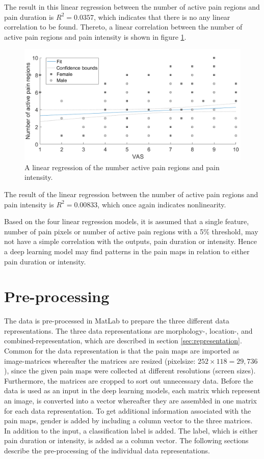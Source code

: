 \noindent
The result in this linear regression between the number of active pain regions and pain duration is $R^2=0.0357$, which indicates that there is no any linear correlation to be found.\newline
Thereto, a linear correlation between the number of active pain regions and pain intensity is shown in figure \ref{fig:regPain}.

\begin{figure} [H]
\centering
\includegraphics[width=1\textwidth]{figures/vasregion}
\caption{A linear regression of the number active pain regions and pain intensity.}
\label{fig:regPain}
\end{figure}

\noindent
The result of the linear regression between the number of active pain regions and pain intensity is $R^2=0.00833$, which once again indicates nonlinearity. 

\noindent
Based on the four linear regression models, it is assumed that a single feature, number of pain pixels or number of active pain regions with a 5\% threshold, may not have a simple correlation with the outputs, pain duration or intensity. Hence a deep learning model may find patterns in the pain maps in relation to either pain duration or intensity.\newpage


\section{Pre-processing} \label{sec:prepros}
The data is pre-processed in MatLab to prepare the three different data representations. The three data representations are morphology-, location-, and combined-representation, which are described in section \ref{sec:representation}. Common for the data representation is that the pain maps are imported as image-matrices whereafter the matrices are resized (pixelsize: $252 \times 118 = 29,736$), since the given pain maps were collected at different resolutions (screen sizes). Furthermore, the matrices are cropped to sort out unnecessary data.
Before the data is used as an input in the deep learning models, each matrix which represent an image, is converted into a vector whereafter they are assembled in one matrix for each data representation. To get additional information associated with the pain maps, gender is added by including a column vector to the three matrices.
In addition to the input, a classification label is added. The label, which is either pain duration or intensity, is added as a column vector.
The following sections describe the pre-processing of the individual data representations.

